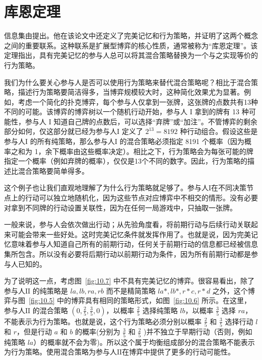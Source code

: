 \section{库恩定理}\label{sec10.8}

信息集由\citet{kuhn1953}提出。他在该论文中还定义了完美记忆和行为策略，并证明了这两个概念之间的重要联系。这种联系是扩展型博弈的核心性质，通常被称为“库恩定理”。该定理指出，具有完美记忆的参与人总可以将其混合策略替换为一个与之实现等价的行为策略。

我们为什么要关心参与人是否可以使用行为策略来替代混合策略呢？相比于混合策略，描述行为策略要简洁得多，当博弈规模较大时，这种简化效果尤为显著。例如，考虑一个简化的扑克博弈，每个参与人仅拿到一张牌，这张牌的点数共有13种不同的可能。该博弈的博弈树以一个随机行动开始，参与人 \(\mathrm{I}\) 拿到的牌有 13 种可能性，参与人 \(\mathrm{I}\) 知道自己牌的点数后，可以选择“弃牌”或“加注”。不管博弈的剩余部分如何，仅这部分就已经为参与人\(\mathrm{I}\) 定义了 \({2}^{13} = {8192}\) 种行动组合。假设这些是参与人\(\mathrm{I}\) 的所有纯策略，那么参与人\(\mathrm{I}\) 的混合策略必须指定 8191 个概率（因为概率之和为 1，余下概率由这些概率决定）。相比之下，行为策略会为每张可能的牌指定一个概率（例如弃牌的概率），仅仅是13个不同的数字。因此，行为策略的描述比混合策略要简单得多。

这个例子也让我们直观地理解了为什么行为策略就足够了。参与人\(\mathrm{I}\)在不同决策节点上的行动可以独立地随机化，因为这些节点对应博弈中不相交的情形。没有必要对拿到不同牌的行动设置关联性，因为在任何一局游戏中，只抽取一张牌。

一般来说，参与人会依次做出行动；从先验角度看，将前期行动与后续行动关联起来可能会带来一些好处。这时完美记忆条件就发挥作用了。也就是说，因为完美记忆意味着参与人知道自己所有的前期行动，任何关于前期行动的信息都已经被信息集所包含。所以没有必要将后期行动以前期行动为条件，因为所有前期行动都是参与人已知的。

为了说明这一点，考虑图~\ref{fig:10.7} 中不具有完美记忆的博弈。很容易看出，除了参与人\(\mathrm{II}\) 的纯策略是 \({la},{lb},{ra},{rb}\) 而不是精简策略 \({la} * ,{lb} * ,r * c,r * d\) 之外，这个博弈与图~\ref{fig:10.5} 中的博弈具有相同的策略形式，如图~\ref{fig:10.6} 所示。在这里，参与人\(\mathrm{II}\) 的混合策略 \(\left( {0,\frac{2}{5},\frac{3}{5},0}\right)\)，以概率 \(\frac{2}{5}\) 选择纯策略 \({lb}\)，以概率 \(\frac{3}{5}\) 选择 \({ra}\)，不能表示为行为策略。也就是说，这个行为策略必须分别以概率 \(\frac{2}{5}\) 和 \(\frac{3}{5}\) 选择行动 \(l\) 和 \(r\)，但是行动 \(a\) 和 \(b\) 的概率(分别为 \(\frac{3}{5}\) 和 \(\frac{2}{5}\) )并不独立于早期行动（否则，例如纯策略 \({la}\)）的概率就不会为零)。所以这个属于均衡组成部分的混合策略不能表示为行为策略。使用混合策略为参与人\(\mathrm{II}\)在博弈中提供了更多的行动可能性。

